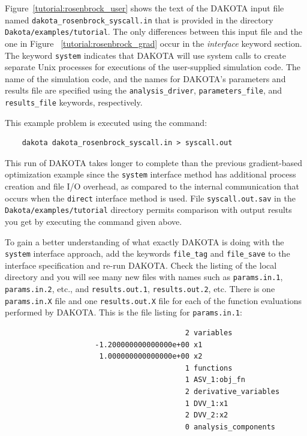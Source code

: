 Figure~\ref{tutorial:rosenbrock_user} shows the text of the DAKOTA
input file named \texttt{dakota\_rosenbrock\_syscall.in} that is
provided in the directory \texttt{Dakota/examples/tutorial}.
The only differences between this input file and the one in Figure~
\ref{tutorial:rosenbrock_grad} occur in the \emph{interface} keyword
section. The keyword \texttt{system} indicates that DAKOTA will use
system calls to create separate Unix processes for executions of the
user-supplied simulation code. The name of the simulation code, and
the names for DAKOTA's parameters and results file are specified using
the \texttt{analysis\_driver}, \texttt{parameters\_file}, and
\texttt{results\_file} keywords, respectively.

This example problem is executed using the command:
\begin{small}
\begin{verbatim}
    dakota dakota_rosenbrock_syscall.in > syscall.out
\end{verbatim}
\end{small}

This run of DAKOTA takes longer to complete than the previous
gradient-based optimization example since the \texttt{system}
interface method has additional process creation and file I/O
overhead, as compared to the internal communication that occurs when
the \texttt{direct} interface method is used. File
\texttt{syscall.out.sav} in the
\texttt{Dakota/examples/tutorial} directory permits comparison with
output results you get by executing the command given above.

To gain a better understanding of what exactly DAKOTA is doing with
the \texttt{system} interface approach, add the keywords
\texttt{file\_tag} and \texttt{file\_save} to the interface
specification and re-run DAKOTA. Check the listing of the local
directory and you will see many new files with names such as
\texttt{params.in.1}, \texttt{params.in.2}, etc., and
\texttt{results.out.1}, \texttt{results.out.2}, etc. There is one
\texttt{params.in.X} file and one \texttt{results.out.X} file for each
of the function evaluations performed by DAKOTA. This is the file
listing for \texttt{params.in.1}:
\begin{small}
\begin{verbatim}
                                          2 variables
                     -1.200000000000000e+00 x1
                      1.000000000000000e+00 x2
                                          1 functions
                                          1 ASV_1:obj_fn
                                          2 derivative_variables
                                          1 DVV_1:x1
                                          2 DVV_2:x2
                                          0 analysis_components
\end{verbatim}
\end{small}

